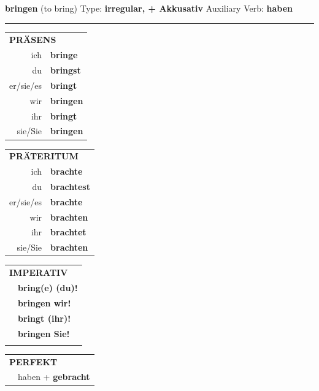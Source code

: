 \documentclass[10pt,a4paper]{revtex4-2}
\begin{document}
\begin{verbbox-acc}
    {\Large \bf bringen} (to bring) \hfill Type: \textbf{irregular, + Akkusativ} \hfill Auxiliary Verb: \textbf{haben} 
    
     \vspace{5pt}

    \hrule
    
    \vspace{5pt}

  \begin{tabular}{rl}
     \multicolumn{2}{l}{\textbf{PRÄSENS} }\\
    ich & \textbf{bringe}\\
    du & \textbf{bringst}\\
    er/sie/es & \textbf{bringt}\\
    wir & \textbf{bringen}\\
    ihr & \textbf{bringt}\\
    sie/Sie & \textbf{bringen}\\
  \end{tabular}
  \hfill
     \begin{tabular}{rl}
    \multicolumn{2}{l}{\textbf{PRÄTERITUM} }\\
    ich & \textbf{brachte}\\
    du & \textbf{brachtest}\\
    er/sie/es & \textbf{brachte}\\
    wir & \textbf{brachten}\\
    ihr & \textbf{brachtet}\\
    sie/Sie & \textbf{brachten}\\
  \end{tabular}
  \hfill
  \begin{tabular}{rl}
     \multicolumn{2}{l}{\textbf{IMPERATIV} }\\
   & \textbf{bring(e) (du)!}\\
   & \textbf{bringen wir!}\\
   & \textbf{bringt (ihr)!}\\
   & \textbf{bringen Sie!}\\
   & \vspace{10pt}
  \end{tabular}

    \vspace{10pt}

 \begin{tabular}{rl}
     \multicolumn{2}{l}{\textbf{PERFEKT}}\\
 &   haben + \textbf{gebracht}\\
  \end{tabular}
\hfill
   \begin{tabular}{rl}
   

\end{tabular}
\end{verbbox-acc}
\end{document}
